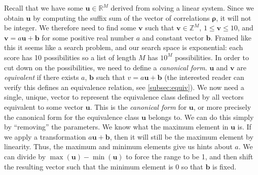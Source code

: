 \documentclass[11pt, oneside]{article}
\renewcommand{\vec}[1]{\bm{#1}}
\theoremstyle{plain}
\theoremstyle{definition}
\begin{document}
Recall that we have some \( \vec{u} \in \mathbb{R}^M \) derived from solving
a linear system. Since we obtain \( \vec{u} \) by computing the suffix sum
of the vector of correlations \( \vec{\rho} \), it will not be integer. We
therefore need to find some \( \vec{v} \) such that \( \vec{v} \in \mathbb{Z}^M
\), \( 1 \leq \vec{v} \leq 10 \), and \( \vec{v} = a \vec{u} + \vec{b} \)
for some positive real number \( a \) and constant vector \( \vec{b} \).
Framed like this it seems like a search problem, and our search space is
exponential: each score has 10 possibilities so a list of length \( M \)
has \( 10^M \) possibilities. In order to cut down on the possibilities, we
need to define a \textit{canonical form}. \( \vec{u} \) and \( \vec{v} \)
are \textit{equivalent} if there exists \( a \), \( \vec{b} \) such that \(
v = a \vec{u} + \vec{b} \) (the interested reader can verify this defines
an equivalence relation, see \autoref{subsec:equiv}). We now need a single,
unique, vector to represent the equivalence class defined by all vectors
equivalent to some vector \( \vec{u} \). This is the \textit{canonical form}
for \( \vec{u} \), or more precisely the canonical form for the equivalence
class \( \vec{u} \) belongs to. We can do this simply by \enquote{removing}
the parameters. We know what the maximum element in \( \vec{u} \) is. If we
apply a transformation \( a \vec{u} + \vec{b} \), then it will still be the
maximum element by linearity. Thus, the maximum and minimum elements give us
hints about \( a \). We can divide by \( \max(\vec{u}) - \min(\vec{u}) \) to
force the range to be 1, and then shift the resulting vector such that the
minimum element is 0 so that \( \vec{b} \) is fixed.
\end{document}
